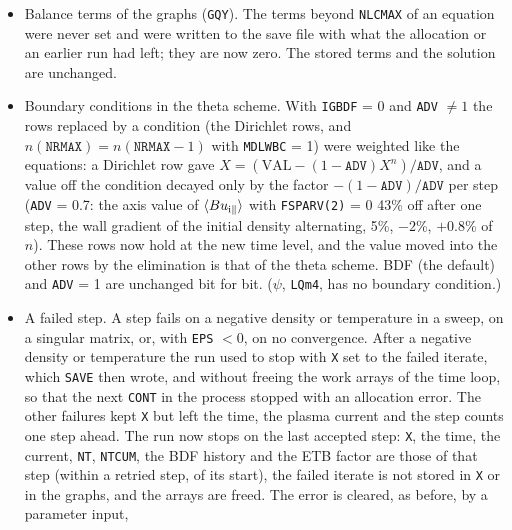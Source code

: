 \documentclass[11pt]{article}
\def\r#1{{\rm#1}}
\begin{document}
\begin{itemize}
  \texttt{LOAD}.  For a file of an earlier version they are formed from \texttt{NT} and
  \texttt{NTMAX} in the file: exact for a file written at the end of a run, unheld for a run that
  stopped early after an earlier run had held the factor.  An older binary reads a new file without
  the record.  With \texttt{MDLETB} = 1 the held value changes by $3\times10^{-17}$ and the results
  by round-off.
\item Balance terms of the graphs (\texttt{GQY}).  The terms beyond \texttt{NLCMAX} of an equation were
  never set and were written to the save file with what the allocation or an earlier run had left;
  they are now zero.  The stored terms and the solution are unchanged.
\item Boundary conditions in the theta scheme.  With \texttt{IGBDF} = 0 and \texttt{ADV} $\neq 1$ the
  rows replaced by a condition (the Dirichlet rows, and $n(\texttt{NRMAX}) = n(\texttt{NRMAX}-1)$ with
  \texttt{MDLWBC} = 1) were weighted like the equations: a Dirichlet row gave
  $X = (\mathrm{VAL} - (1-\texttt{ADV})X^n)/\texttt{ADV}$, and a value off the condition decayed only by
  the factor $-(1-\texttt{ADV})/\texttt{ADV}$ per step (\texttt{ADV} = 0.7: the axis value of
  $\langle B u_{\r{i}\parallel}\rangle$ with \texttt{FSPARV(2)} = 0 43\% off after one step, the
  wall gradient of the initial density alternating, 5\%, $-2$\%, $+0.8$\% of $n$).  These rows now
  hold at the new time level, and the value moved into the other rows by the elimination is that of
  the theta scheme.  BDF (the default) and \texttt{ADV} = 1 are unchanged bit for bit.  ($\psi$,
  \texttt{LQm4}, has no boundary condition.)
\item A failed step.  A step fails on a negative density or temperature in a sweep, on a singular
  matrix, or, with \texttt{EPS} $< 0$, on no convergence.  After a negative density or temperature the
  run used to stop with \texttt{X} set to the failed iterate, which \texttt{SAVE} then wrote, and
  without freeing the work arrays of the time loop, so that the next \texttt{CONT} in the process
  stopped with an allocation error.  The other failures kept \texttt{X} but left the time, the plasma
  current and the step counts one step ahead.  The run now stops on the last accepted step: \texttt{X},
  the time, the current, \texttt{NT}, \texttt{NTCUM}, the BDF history and the ETB factor are those of
  that step (within a retried step, of its start), the failed iterate is not stored in \texttt{X} or
  in the graphs, and the arrays are freed.  The error is cleared, as before, by a parameter input,

\end{itemize}
\end{document}
